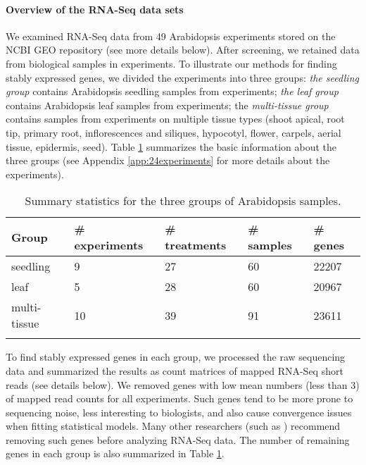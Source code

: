 \paragraph{Overview of the RNA-Seq data sets}
We examined RNA-Seq data from 49 Arabidopsis experiments stored on the NCBI
GEO repository (see more details below). After screening, we retained data
from \howmanySamples biological samples in \howmanylab experiments.  To illustrate our methods
for finding stably expressed genes, we divided the experiments into three
groups: \textit{the seedling group} contains \howmanyseedlingsample Arabidopsis seedling samples
from \howmanyseedlingexperiment experiments; \textit{ the leaf group} contains \howmanyleafsample 
Arabidopsis leaf
samples from \howmanyleafexperiment experiments;  the \textit{multi-tissue group} contains 
\howmanytissuesample
samples from \howmanytissueexperiment experiments on multiple tissue types (shoot apical, root tip,
primary root, inflorescences and siliques, hypocotyl, flower, carpels, aerial
tissue, epidermis, seed).  Table \ref{table:TableSet3} summarizes the basic information about
the three groups (see Appendix 
\ref{app:24experiments} for more details about the \howmanylab experiments).
\begin{table}[!ht]
	\centering
	\caption[Summary statistics for the three groups of Arabidopsis samples]{Summary statistics for 
	the three groups of Arabidopsis samples.}
	\begin{tabular}{lp{3cm}p{3cm}p{2.5cm}p{2cm}} \hline
		Group & \#  experiments & \# treatments  & \# samples & \# genes \\ \hline
		seedling &   9 &  27 &  60 & 22207 \\ 
		leaf &   5 &  28 &  60 & 20967 \\ 
		multi-tissue &  10 &  39 &  91 & 23611 \\ \hline
		\label{table:TableSet3}
	\end{tabular}
\end{table}

To find stably expressed genes in each group, we processed the raw
sequencing data and summarized the results as count matrices of mapped RNA-Seq
short reads (see details below).  We removed genes with low mean numbers (less
than 3) of mapped read counts for all experiments.  Such genes tend to be more prone to sequencing
noise, less interesting to biologists, and also cause convergence issues when
fitting statistical models. Many other researchers (such as \citealt{anders2013count})
recommend removing such genes before analyzing RNA-Seq data.  The number of
remaining genes in each group is also summarized in Table
\ref{table:TableSet3}.


